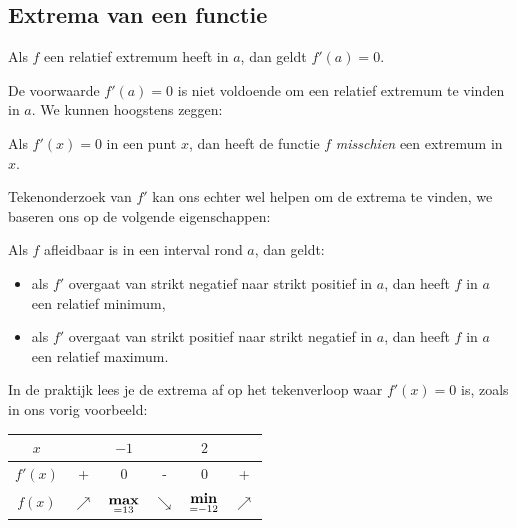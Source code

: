 \documentclass[a4paper,12pt,twoside]{article}
\newenvironment{eigenschap}{
  \begin{mdframed}[nobreak=true,frametitle={Eigenschap}]
  }{%
  \end{mdframed}
}
\newenvironment{kader}{
  \begin{mdframed}[nobreak=true]
  }{%
  \end{mdframed}
}
\begin{document}



\subsection{Extrema van een functie}

\begin{eigenschap}
  Als $f$ een relatief extremum heeft in $a$, dan geldt $f'(a)=0$.
\end{eigenschap}

De voorwaarde $f'(a)=0$ is niet voldoende om een relatief extremum te vinden in $a$. We kunnen hoogstens zeggen:

\begin{kader}
  Als $f'(x)=0$ in een punt $x$, dan heeft de functie $f$ {\em misschien} een extremum in $x$.
\end{kader}
Tekenonderzoek van $f'$ kan ons echter wel helpen om de extrema te vinden, we baseren ons op de volgende eigenschappen:

\begin{eigenschap}
  Als $f$ afleidbaar is in een interval rond $a$, dan geldt:
  \begin{itemize}
  \item als $f'$ overgaat van strikt negatief naar strikt positief in $a$, dan heeft $f$ in $a$ een relatief minimum,
  \item als $f'$ overgaat van strikt positief naar strikt negatief in $a$, dan heeft $f$ in $a$ een relatief maximum.
  \end{itemize}
\end{eigenschap}

In de praktijk lees je de extrema af op het tekenverloop waar $f'(x)=0$ is, zoals in ons vorig voorbeeld:

\begin{center}
  \begin{tabular}{c|ccccc}
    $x$ & \hspace*{1.0cm} & $-1$ & \hspace*{1.0cm} & $2$ & \hspace*{1.0cm}\\
    \hline
    $f'(x)$ & + & 0 & - & 0 & +\\
    \hline
    $f(x)$ & $\nearrow$ &  $\underset{=13}{\bf max}$ & $\searrow$ & $\underset{=-12}{\bf min}$ & $\nearrow$
  \end{tabular}
\end{center}
\end{document}
